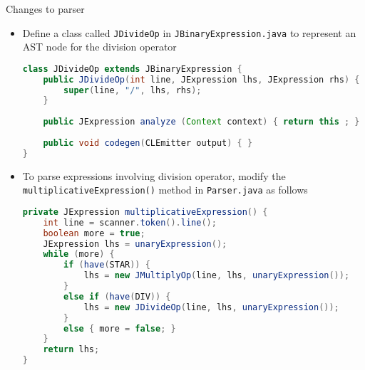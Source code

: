 \documentclass[8pt,a4paper,compress]{beamer}
\begin{document}
\begin{frame}[fragile]
\pause

Changes to parser
\begin{itemize}
\item Define a class called \lstinline{JDivideOp} in \lstinline{JBinaryExpression.java} to represent an AST node for the division operator

\begin{lstlisting}[language=Java]
class JDivideOp extends JBinaryExpression {
    public JDivideOp(int line, JExpression lhs, JExpression rhs) {
        super(line, "/", lhs, rhs);
    }
    
    public JExpression analyze (Context context) { return this ; }
    
    public void codegen(CLEmitter output) { }
}
\end{lstlisting}

\item To parse expressions involving division operator, modify the \lstinline{multiplicativeExpression()} method in \lstinline{Parser.java} as follows

\begin{lstlisting}[language=Java]
private JExpression multiplicativeExpression() {
    int line = scanner.token().line();
    boolean more = true;
    JExpression lhs = unaryExpression();
    while (more) {
        if (have(STAR)) {
            lhs = new JMultiplyOp(line, lhs, unaryExpression());
        }
        else if (have(DIV)) {
            lhs = new JDivideOp(line, lhs, unaryExpression());
        }
        else { more = false; }
    }
    return lhs;
}
\end{lstlisting}
\end{itemize}
\end{frame}
\end{document}
